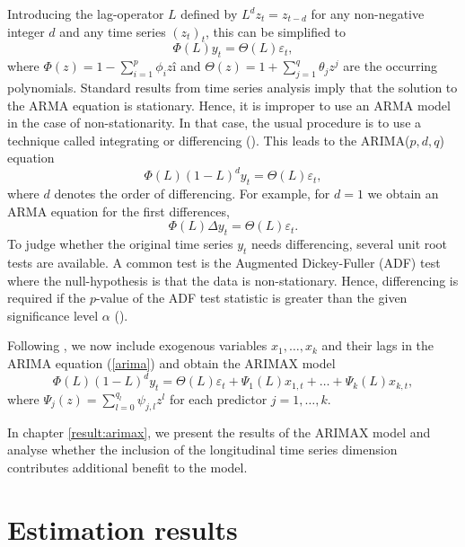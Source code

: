 \documentclass[a4paper, 12pt]{scrreprt}
\begin{document}
Introducing the lag-operator $L$ defined by $L^d z_t = z_{t-d}$ for any non-negative integer $d$ and any time series $(z_t)_t$, this can be simplified to
\begin{equation}
\Phi(L) y_t = \Theta(L) \varepsilon_t,
\end{equation}
where $\Phi(z) = 1 - \sum_{i=1}^p \phi_i zî$ and $\Theta(z) = 1 + \sum_{j=1}^q \theta_j z^j$ are the occurring polynomials.
Standard results from time series analysis imply that the solution to the ARMA equation is stationary. Hence, it is improper to use an ARMA model in the case of non-stationarity. 
In that case, the usual procedure is to use a technique called integrating or differencing (\textcite[chapter 13.1]{kreiss2006zeitreihenanalysis}). This leads to the ARIMA($p,d,q$) equation
\begin{equation}\label{arima}
\Phi(L) (1-L)^d y_t = \Theta(L) \varepsilon_t,
\end{equation}
where $d$ denotes the order of differencing. For example, for $d=1$ we obtain an ARMA equation for the first differences,
\begin{equation}
\Phi(L) \Delta y_t = \Theta(L) \varepsilon_t.
\end{equation}
To judge whether the original time series $y_t$ needs differencing, several unit root tests are available. A common test is the Augmented Dickey-Fuller (ADF) test where the null-hypothesis is that the data is non-stationary. Hence, differencing is required if the $p$-value of the ADF test statistic is greater than the given significance level $\alpha$ (\textcite[chapter 8.1]{hyndman2014forecasting}).

Following \textcite[chapter 2.1]{kongcharoen2013autoregressive}, we now include exogenous variables $x_1, \ldots, x_k$ and their lags in the ARIMA equation (\ref{arima}) and obtain the ARIMAX model
\begin{equation}\label{arimax}
\Phi(L) (1-L)^d y_t = \Theta(L) \varepsilon_t + \Psi_1(L) x_{1,t} + \ldots + \Psi_k(L) x_{k,t},
\end{equation}
where $\Psi_j(z) = \sum_{l=0}^{q_l} \psi_{j,l} z^l$ for each predictor $j=1,\ldots,k$.

In chapter \ref{result:arimax}, we present the results of the ARIMAX model and analyse whether the inclusion of the longitudinal time series dimension contributes additional benefit to the model.



\chapter{Estimation results}\label{result:all}
\end{document}
